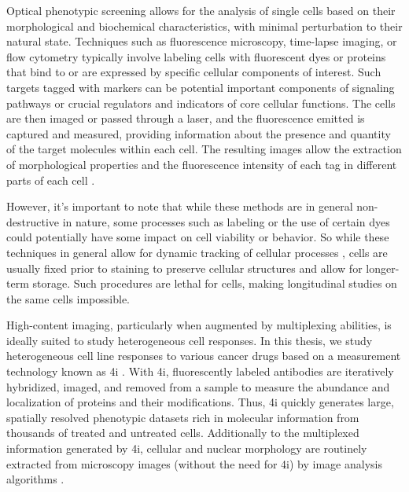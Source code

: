 Optical phenotypic screening allows for the analysis of single cells based on their morphological and biochemical characteristics, with minimal perturbation to their natural state. 
Techniques such as fluorescence microscopy, time-lapse imaging, or flow cytometry typically involve labeling cells with fluorescent dyes or proteins that bind to or are expressed by specific cellular components of interest.
Such targets tagged with markers can be potential important components of signaling pathways or crucial regulators and indicators of core cellular functions. 
The cells are then imaged or passed through a laser, and the fluorescence emitted is captured and measured, providing information about the presence and quantity of the target molecules within each cell. 
The resulting images allow the extraction of morphological properties and the fluorescence intensity of each tag in different parts of each cell \citep{carpenter2006cellprofiler}.

However, it's important to note that while these methods are in general non-destructive in nature, some processes such as labeling or the use of certain dyes could potentially have some impact on cell viability or behavior. So while these techniques in general allow for dynamic tracking of cellular processes \citep{fischer2019inferring, hashimoto2016learning, tvarusko1999time, busch2015fundamental}, cells are usually fixed prior to staining to preserve cellular structures and allow for longer-term storage. Such procedures are lethal for cells, making longitudinal studies on the same cells impossible.

High-content imaging, particularly when augmented by multiplexing abilities, is ideally suited to study heterogeneous cell responses.
In this thesis, we study heterogeneous cell line responses to various cancer drugs based on a measurement technology known as \acrfull{4i} \citep{gut2018multiplexed}.
With 4i, fluorescently labeled antibodies are iteratively hybridized, imaged, and removed from a sample to measure the abundance and localization of proteins and their modifications. 
Thus, 4i quickly generates large, spatially resolved phenotypic datasets rich in molecular information from thousands of treated and untreated cells. Additionally to the multiplexed information generated by 4i, cellular and nuclear morphology are routinely extracted from microscopy images (without the need for 4i) by image analysis algorithms \citep{carpenter2006cellprofiler}.


